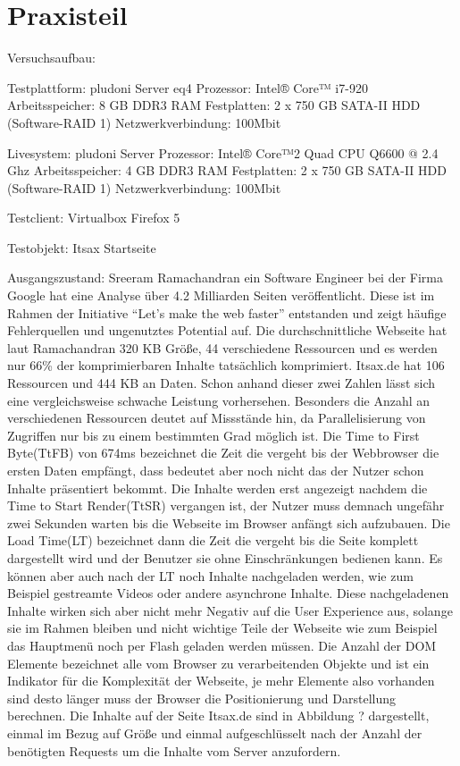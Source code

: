 
\part{Praxisteil}

Versuchsaufbau:

Testplattform: pludoni Server eq4
Prozessor: Intel® Core™ i7-920
Arbeitsspeicher: 8 GB DDR3 RAM
Festplatten: 2 x 750 GB SATA-II HDD (Software-RAID 1)
Netzwerkverbindung: 100Mbit

Livesystem: pludoni Server 
Prozessor: Intel® Core™2 Quad CPU Q6600 @ 2.4 Ghz
Arbeitsspeicher: 4 GB DDR3 RAM
Festplatten: 2 x 750 GB SATA-II HDD (Software-RAID 1) %
Netzwerkverbindung: 100Mbit

Testclient: Virtualbox
Firefox 5

Testobjekt:
Itsax Startseite


Ausgangszustand:
Sreeram Ramachandran ein Software Engineer bei der Firma Google hat eine Analyse über 4.2 Milliarden Seiten veröffentlicht. Diese ist im Rahmen der Initiative ``Let's make the web faster'' entstanden und zeigt häufige Fehlerquellen und ungenutztes Potential auf. Die durchschnittliche Webseite hat laut Ramachandran 320 KB Größe, 44 verschiedene Ressourcen und es werden nur 66\% der komprimierbaren Inhalte tatsächlich komprimiert.
Itsax.de hat 106 Ressourcen und 444 KB an Daten. Schon anhand dieser zwei Zahlen lässt sich eine vergleichsweise schwache Leistung vorhersehen. Besonders die Anzahl an verschiedenen Ressourcen deutet auf Missstände hin, da Parallelisierung von Zugriffen nur bis zu einem bestimmten Grad möglich ist. Die Time to First Byte(TtFB) von 674ms bezeichnet die Zeit die vergeht bis der Webbrowser die ersten Daten empfängt, dass bedeutet aber noch nicht das der Nutzer schon Inhalte präsentiert bekommt. Die Inhalte werden erst angezeigt nachdem die Time to Start Render(TtSR) vergangen ist, der Nutzer muss demnach ungefähr zwei Sekunden warten bis die Webseite im Browser anfängt sich aufzubauen. Die Load Time(LT) bezeichnet dann die Zeit die vergeht bis die Seite komplett dargestellt wird und der Benutzer sie ohne Einschränkungen bedienen kann. Es können  aber auch nach der LT noch Inhalte nachgeladen werden, wie zum Beispiel gestreamte Videos oder andere asynchrone Inhalte. Diese nachgeladenen Inhalte wirken sich aber nicht mehr Negativ auf die User Experience aus, solange sie im Rahmen bleiben und nicht wichtige Teile der Webseite wie zum Beispiel das Hauptmenü noch per Flash geladen werden müssen. Die Anzahl der DOM Elemente bezeichnet alle vom Browser zu verarbeitenden Objekte und ist ein Indikator für die Komplexität der Webseite, je mehr Elemente also vorhanden sind desto länger muss der Browser die Positionierung und Darstellung berechnen. Die Inhalte auf der Seite Itsax.de sind in Abbildung ? dargestellt, einmal im Bezug auf Größe und einmal aufgeschlüsselt nach der Anzahl der benötigten Requests um die Inhalte vom Server anzufordern. 

